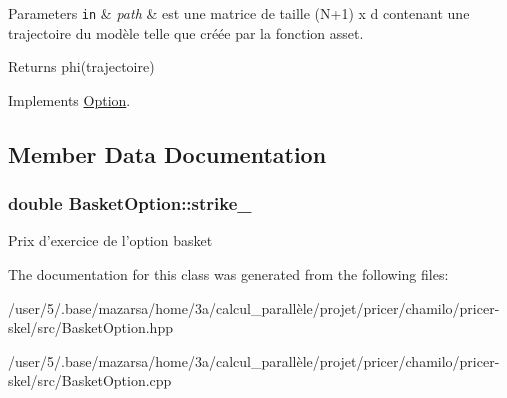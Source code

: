 \begin{DoxyParams}[1]{Parameters}
\mbox{\tt in}  & {\em path} & est une matrice de taille (N+1) x d contenant une trajectoire du modèle telle que créée par la fonction asset. \\
\hline
\end{DoxyParams}
\begin{DoxyReturn}{Returns}
phi(trajectoire) 
\end{DoxyReturn}


Implements \hyperlink{classOption_abe90882a11f5436077425249e3f32204}{Option}.



\subsection{Member Data Documentation}
\hypertarget{classBasketOption_abf96256c30b8e0d063611b11972d32c5}{
\subsubsection[{strike\-\_\-}]{\setlength{\rightskip}{0pt plus 5cm}double Basket\-Option\-::strike\-\_\-}}\label{classBasketOption_abf96256c30b8e0d063611b11972d32c5}
Prix d'exercice de l'option basket 

The documentation for this class was generated from the following files\-:\begin{DoxyCompactItemize}
\item 
/user/5/.\-base/mazarsa/home/3a/calcul\-\_\-parallèle/projet/pricer/chamilo/pricer-\/skel/src/Basket\-Option.\-hpp\item 
/user/5/.\-base/mazarsa/home/3a/calcul\-\_\-parallèle/projet/pricer/chamilo/pricer-\/skel/src/Basket\-Option.\-cpp\end{DoxyCompactItemize}
